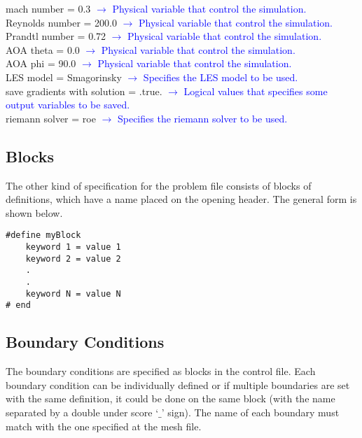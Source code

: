 \documentclass[a4paper,10pt]{report}
\begin{document}
{\begin{minipage}{\textwidth}
mach number = 0.3
\textcolor{blue}{$\longrightarrow$ Physical variable that control the simulation.}\\
Reynolds number = 200.0
\textcolor{blue}{$\longrightarrow$ Physical variable that control the simulation.}\\
Prandtl number = 0.72
\textcolor{blue}{$\longrightarrow$ Physical variable that control the simulation.}\\
AOA theta = 0.0
\textcolor{blue}{$\longrightarrow$ Physical variable that control the simulation.}\\
AOA phi = 90.0
\textcolor{blue}{$\longrightarrow$ Physical variable that control the simulation.}\\
LES model 				 = Smagorinsky
\textcolor{blue}{$\longrightarrow$ Specifies the LES model to be used.}\\
save gradients with solution = .true.
\textcolor{blue}{$\longrightarrow$ Logical values that specifies some output variables to be saved.}\\
riemann solver = roe
\textcolor{blue}{$\longrightarrow$ Specifies the riemann solver to be used.}\\
\end{minipage}
}

\subsection{Blocks}\label{sect.blocks}

The other kind of specification for the problem file consists of blocks of definitions, which have a name placed on the opening header. The general form is shown below.

\lstset{style=mystyle}
\vspace{0.2 in}
\begin{lstlisting}
#define myBlock
	keyword 1 = value 1
	keyword 2 = value 2
	.
	.
	keyword N = value N
# end
\end{lstlisting}

\subsection{Boundary Conditions}

The boundary conditions are specified as blocks in the control file. Each boundary condition can be individually defined or if multiple boundaries are set with the same definition, it could be done on the same block (with the name separated by a double under score `$\_$' sign). The name of each boundary must match with the one specified at the mesh file.
\end{document}
